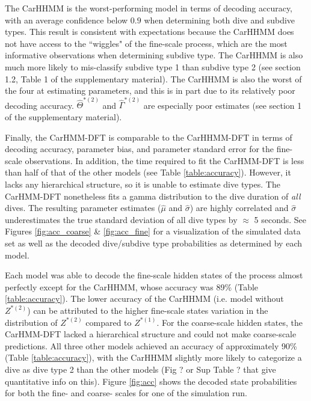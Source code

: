 The CarHHMM is the worst-performing model in terms of decoding accuracy, with an average confidence below $0.9$ when determining both dive and subdive types. This result is consistent with expectations because the CarHHMM does not have access to the ``wiggles" of the fine-scale process, which are the most informative observations when determining subdive type. The CarHHMM is also much more likely to mis-classify subdive type 1 than subdive type 2 (see section 1.2, Table 1 of the supplementary material). The CarHHMM is also the worst of the four at estimating parameters, and this is in part due to its relatively poor decoding accuracy. $\hat \Theta^{*(2)}$ and $\hat \Gamma^{*(2)}$ are especially poor estimates (see section 1 of the supplementary material).

Finally, the CarHMM-DFT is comparable to the CarHHMM-DFT in terms of decoding accuracy, parameter bias, and parameter standard error for the fine-scale observations. In addition, the time required to fit the CarHMM-DFT is less than half of that of the other models (see Table \ref{table:accuracy}). However, it lacks any hierarchical structure, so it is unable to estimate dive types. The CarHMM-DFT nonetheless fits a gamma distribution to the dive duration of \textit{all} dives. The resulting parameter estimates ($\hat \mu$ and $\hat \sigma$) are highly correlated and $\hat \sigma$ underestimates the true standard deviation of all dive types by $\approx$ 5 seconds. See Figures \ref{fig:acc_coarse} \& \ref{fig:acc_fine} for a visualization of the simulated data set as well as the decoded dive/subdive type probabilities as determined by each model.






\iffalse
Each model was able to decode the fine-scale hidden states of the process almost perfectly except for the CarHHMM, whose accuracy was 89\% (Table \ref{table:accuracy}). The lower accuracy of the CarHHMM (i.e. model without $Z^{*(2)}$)  can be attributed to the higher fine-scale states variation in the distribution of $Z^{*(2)}$ compared to $Z^{*(1)}$. For the coarse-scale hidden states, the CarHMM-DFT lacked a hierarchical structure and could not make coarse-scale predictions. All three other models achieved an accuracy of approximately 90\% (Table \ref{table:accuracy}), with the CarHHMM slightly more likely to categorize a dive as dive type 2 than the other models (Fig ? or Sup Table ? that give quantitative info on this). Figure \ref{fig:acc} shows the decoded state probabilities for both the fine- and coarse- scales for one of the simulation run.

